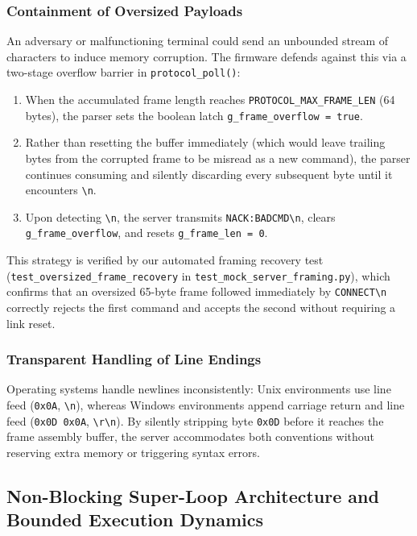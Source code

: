 \subsubsection{Containment of Oversized Payloads}
An adversary or malfunctioning terminal could send an unbounded stream of characters to induce memory corruption.
The firmware defends against this via a two-stage overflow barrier in \texttt{protocol\_poll()}:
\begin{enumerate}
    \item When the accumulated frame length reaches \texttt{PROTOCOL\_MAX\_FRAME\_LEN} (64 bytes), the parser sets the boolean latch \texttt{g\_frame\_overflow = true}.
    \item Rather than resetting the buffer immediately (which would leave trailing bytes from the corrupted frame to be misread as a new command), the parser continues consuming and silently discarding every subsequent byte until it encounters \texttt{\textbackslash n}.
    \item Upon detecting \texttt{\textbackslash n}, the server transmits \texttt{NACK:BADCMD\textbackslash n}, clears \texttt{g\_frame\_overflow}, and resets \texttt{g\_frame\_len = 0}.
\end{enumerate}
This strategy is verified by our automated framing recovery test (\texttt{test\_oversized\_\allowbreak frame\_\allowbreak recovery} in \texttt{test\_mock\_\allowbreak server\_\allowbreak framing.py}), which confirms that an oversized 65-byte frame followed immediately by \texttt{CONNECT\textbackslash n} correctly rejects the first command and accepts the second without requiring a link reset.

\subsubsection{Transparent Handling of Line Endings}
Operating systems handle newlines inconsistently: Unix environments use line feed (\texttt{0x0A}, \texttt{\textbackslash n}), whereas Windows environments append carriage return and line feed (\texttt{0x0D 0x0A}, \texttt{\textbackslash r\textbackslash n}).
By silently stripping byte \texttt{0x0D} before it reaches the frame assembly buffer, the server accommodates both conventions without reserving extra memory or triggering syntax errors.

\subsection{Non-Blocking Super-Loop Architecture and Bounded Execution Dynamics}

